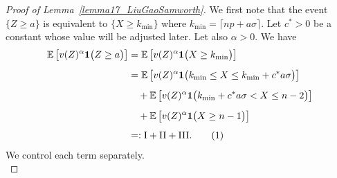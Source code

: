 \documentclass{article}
\newcommand{\one}{\mathbf{1}}
\newcommand\numberthis{\addtocounter{equation}{1}\tag{\theequation}}
\begin{document}
\begin{proof}[Proof of Lemma~\ref{lemma17_LiuGaoSamworth}]


We first note that the event $\{Z \geq a\}$ is equivalent to $\{X \geq k_{\min}\}$ where $k_{\min} = \lceil np + a\sigma\rceil$. Let $c^*>0$ be a constant whose value will be adjusted later. Let also $\alpha > 0$. We have
\begin{align*}
\mathbb E\left[v(Z)^\alpha \one{\big( Z \geq a\big)}\right] &= \mathbb E\left[v(Z)^\alpha \one{\big( X \geq k_{\min}\big)}\right]\\[5pt]
& = \mathbb E\left[v(Z)^\alpha \one{\big( k_{\min} \leq X \leq k_{\min} + c^* a \sigma\big)}\right] \\[5pt]
& \quad + \mathbb E\left[v(Z)^\alpha \one{\big( k_{\min} + c^*a\sigma < X \leq n-2\big)}\right] \\[5pt]
& \quad + \mathbb E\left[v(Z)^\alpha \one{\big(X  \geq n-1\big)}\right]\\[5pt]
& =: \text{I} + \text{II} + \text{III}.\numberthis \label{eq_split_moment_alpha}
\end{align*}
We control each term separately. \\


\end{proof}
\end{document}
